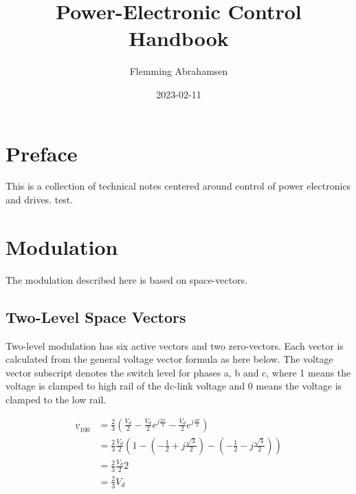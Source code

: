 \documentclass[]{book}
\title{Power-Electronic Control Handbook}
\author{Flemming Abrahamsen}
\date{2023-02-11}
\begin{document}
\maketitle

{
\setcounter{tocdepth}{1}
\tableofcontents
}
\hypertarget{preface}{%
\chapter{Preface}\label{preface}}

This is a collection of technical notes centered around control of power electronics and drives.
test.

\hypertarget{modulation}{%
\chapter{Modulation}\label{modulation}}

The modulation described here is based on space-vectors.

\hypertarget{two-level-space-vectors}{%
\section{Two-Level Space Vectors}\label{two-level-space-vectors}}

Two-level modulation has six active vectors and two zero-vectors. Each vector is calculated from the general voltage vector formula as here below. The voltage vector subscript denotes the switch level for phases a, b and c, where 1 means the voltage is clamped to high rail of the dc-link voltage and 0 means the voltage is clamped to the low rail.

\[
\begin{aligned}
\underline{v}_{100} 
& = \frac{2}{3} \left( \frac{V_d}{2} - \frac{V_d}{2} e^{j \frac{2 \pi}{3}}- \frac{V_d}{2} e^{j \frac{4 \pi}{3}} \right)\\
& = \frac{2}{3} \frac{V_d}{2} \left( 1-  (- \frac{1}{2}+j\frac{\sqrt{3}}{2}) - (- \frac{1}{2}-j\frac{\sqrt{3}}{2}) \right)\\
& = \frac{2}{3} \frac{V_d}{2} 2\\
& = \frac{2}{3} V_d\\
\end{aligned}
\]
\end{document}
